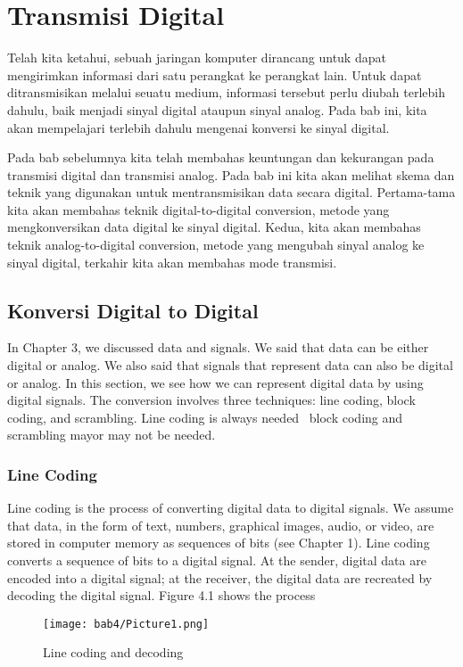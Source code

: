\chapter{Transmisi Digital}
Telah kita ketahui, sebuah jaringan komputer dirancang untuk dapat mengirimkan informasi dari satu perangkat ke perangkat lain. Untuk dapat ditransmisikan melalui seuatu medium, informasi tersebut perlu diubah terlebih dahulu, baik menjadi sinyal digital ataupun sinyal analog. Pada bab ini, kita akan mempelajari terlebih dahulu mengenai konversi ke sinyal digital.

Pada bab sebelumnya kita telah membahas keuntungan dan kekurangan pada transmisi digital dan transmisi analog. Pada bab ini kita akan melihat skema dan teknik yang digunakan untuk mentransmisikan data secara digital. Pertama-tama kita akan membahas teknik digital-to-digital conversion, metode yang mengkonversikan data digital ke sinyal digital. Kedua, kita akan membahas teknik analog-to-digital conversion, metode yang mengubah sinyal analog ke sinyal digital, terkahir kita akan membahas mode transmisi.

\section{Konversi Digital to Digital}
In Chapter 3, we discussed data and signals. We said that data can be either digital or analog. We also said that signals that represent data can also be digital or analog. In this section, we see how we can represent digital data by using digital signals. The conversion involves three techniques: line coding, block coding, and scrambling. Line coding is always needed~ block coding and scrambling mayor may not be needed.

\subsection{Line Coding}
Line coding is the process of converting digital data to digital signals. We assume that data, in the form of text, numbers, graphical images, audio, or video, are stored in computer memory as sequences of bits (see Chapter 1). Line coding converts a sequence of bits to a digital signal. At the sender, digital data are encoded into a digital signal; at the receiver, the digital data are recreated by decoding the digital signal. Figure 4.1 shows the process

\begin{figure}[htbp]
  \centering
  \texttt{[image: bab4/Picture1.png]}
  \caption{Line coding and decoding}
  \label{fig4:1}
\end{figure}

